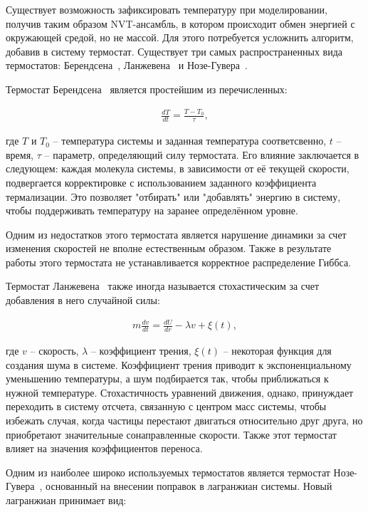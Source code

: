 Существует возможность зафиксировать температуру при моделировании, получив таким образом NVT-ансамбль, в котором происходит обмен энергией с окружающей средой, но не массой. Для этого потребуется усложнить алгоритм, добавив в систему термостат. Существует три самых распространенных вида термостатов: Берендсена~\cite{berendsen_molecular_1984}, Ланжевена~\cite{allen_computer_2017} и Нозе-Гувера~\cite{nose_unified_1984}.

Термостат Берендсена~\cite{berendsen_molecular_1984} является простейшим из перечисленных:

\begin{align}
    \frac{dT}{dt} = \frac{T-T_0}{\tau},
\end{align}

где $T$ и $T_0$ \--- температура системы и заданная температура соответсвенно, $t$ \--- время, $\tau$ \--- параметр, определяющий силу термостата. Его влияние заключается в следующем: каждая молекула системы, в зависимости от её текущей скорости, подвергается корректировке с использованием заданного коэффициента термализации. Это позволяет "отбирать" или "добавлять" энергию в систему, чтобы поддерживать температуру на заранее определённом уровне. 

Одним из недостатков этого термостата является нарушение динамики за счет изменения скоростей не вполне естественным образом. Также в результате работы этого термостата не устанавливается корректное распределение Гиббса.

Термостат Ланжевена~\cite{allen_computer_2017} также иногда называется стохастическим за счет добавления в него случайной силы:

\begin{align}
    m\frac{dv}{dt} = \frac{dU}{dr} - \lambda v + \xi(t),
\end{align}

где $v$ \--- скорость, $\lambda$ \--- коэффициент трения, $\xi(t)$ \--- некоторая функция для создания шума в системе. Коэффициент трения приводит к экспоненциальному уменьшению температуры, а шум подбирается так, чтобы приближаться к нужной температуре. Стохастичность уравнений движения, однако, принуждает переходить в систему отсчета, связанную с центром масс системы, чтобы избежать случая, когда частицы перестают двигаться относительно друг друга, но приобретают значительные сонаправленные скорости. Также этот термостат влияет на значения коэффициентов переноса.

Одним из наиболее широко используемых термостатов является термостат Нозе-Гувера~\cite{nose_unified_1984}, основанный на внесении поправок в лагранжиан системы. Новый лагранжиан принимает вид:

